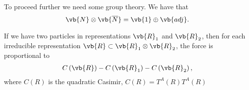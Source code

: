 To proceed further we need some group theory. We have that
\begin{align}
    \vb{N} \otimes \vb{\overline{N}} = \vb{1} \oplus \vb{adj}
.\end{align}

\begin{claim}
    If we have two particles in representations $\vb{R}_1$ and $\vb{R}_2$, then for each irreducible representation $\vb{R} \subset \vb{R}_1 \otimes \vb{R}_2$, the force is proportional to
    \begin{align}
        C\left( \vb{R} \right) - C\left( \vb{R}_1 \right)  - C\left( \vb{R}_2 \right) 
    ,\end{align}
    where $C\left( R \right) $ is the quadratic Casimir, $C\left( R \right) = T^{A}\left( R \right) T^{A}\left( R \right) $
\end{claim}
